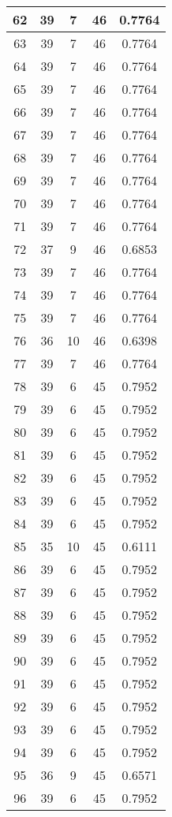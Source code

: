 \documentclass[letterpaper, 12pt]{article}
\begin{document}
\begin{longtable}{|c|c|c|c|c|}
\hline
62 & 39 & 7 & 46 & 0.7764 \\
\hline
63 & 39 & 7 & 46 & 0.7764 \\
\hline
64 & 39 & 7 & 46 & 0.7764 \\
\hline
65 & 39 & 7 & 46 & 0.7764 \\
\hline
66 & 39 & 7 & 46 & 0.7764 \\
\hline
67 & 39 & 7 & 46 & 0.7764 \\
\hline
68 & 39 & 7 & 46 & 0.7764 \\
\hline
69 & 39 & 7 & 46 & 0.7764 \\
\hline
70 & 39 & 7 & 46 & 0.7764 \\
\hline
71 & 39 & 7 & 46 & 0.7764 \\
\hline
72 & 37 & 9 & 46 & 0.6853 \\
\hline
73 & 39 & 7 & 46 & 0.7764 \\
\hline
74 & 39 & 7 & 46 & 0.7764 \\
\hline
75 & 39 & 7 & 46 & 0.7764 \\
\hline
76 & 36 & 10 & 46 & 0.6398 \\
\hline
77 & 39 & 7 & 46 & 0.7764 \\
\hline
78 & 39 & 6 & 45 & 0.7952 \\
\hline
79 & 39 & 6 & 45 & 0.7952 \\
\hline
80 & 39 & 6 & 45 & 0.7952 \\
\hline
81 & 39 & 6 & 45 & 0.7952 \\
\hline
82 & 39 & 6 & 45 & 0.7952 \\
\hline
83 & 39 & 6 & 45 & 0.7952 \\
\hline
84 & 39 & 6 & 45 & 0.7952 \\
\hline
85 & 35 & 10 & 45 & 0.6111 \\
\hline
86 & 39 & 6 & 45 & 0.7952 \\
\hline
87 & 39 & 6 & 45 & 0.7952 \\
\hline
88 & 39 & 6 & 45 & 0.7952 \\
\hline
89 & 39 & 6 & 45 & 0.7952 \\
\hline
90 & 39 & 6 & 45 & 0.7952 \\
\hline
91 & 39 & 6 & 45 & 0.7952 \\
\hline
92 & 39 & 6 & 45 & 0.7952 \\
\hline
93 & 39 & 6 & 45 & 0.7952 \\
\hline
94 & 39 & 6 & 45 & 0.7952 \\
\hline
95 & 36 & 9 & 45 & 0.6571 \\
\hline
96 & 39 & 6 & 45 & 0.7952 \\

\end{longtable}
\end{document}
